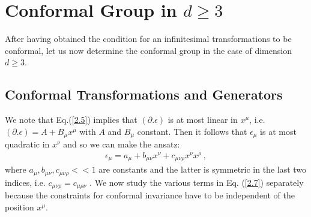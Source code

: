 \documentclass[12pt,a4paper]{report}
\begin{document}
\section{Conformal Group in $d \ge 3$}
After having obtained the condition for an infinitesimal transformations to be conformal, let us now determine the conformal group in the case of dimension $d \ge 3$.
\subsection{Conformal Transformations and Generators}
We note that Eq.(\eqref{2.5}) implies that $(\partial.\epsilon )$ is at most linear in $x^\mu$, i.e. $(\partial.\epsilon)=A+B_\mu x^\mu$ with $A$ and $B_\mu$ constant. Then it follows that $\epsilon_\mu$ is at most quadratic in $x^\nu$ and so we can make the ansatz: \cite{Antonin, Ralph, Francesco, Schellekens, Alday}
\begin{align}
    \epsilon_\mu=a_\mu+b_{\mu\nu}x^\nu+c_{\mu\nu\rho}x^\nu x^\rho~,\label{2.7}
\end{align}
where $a_\mu, b_{\mu\nu} ,c_{\mu\nu\rho}<<1$ are constants and the latter is symmetric in the last two indices, i.e. $c_{\mu\nu\rho}=c_{\mu\rho\nu}$ . We now study the various terms in Eq. (\eqref{2.7}) separately because the constraints for conformal invariance have to be independent of the position $x^\mu$.
\end{document}
